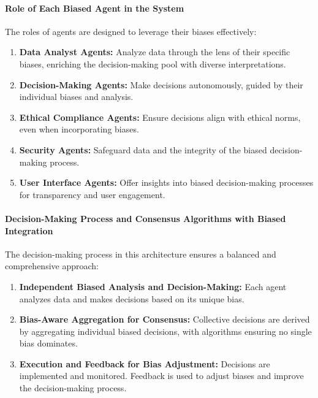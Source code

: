 \hypertarget{role-of-each-biased-agent-in-the-system}{%
\paragraph{Role of Each Biased Agent in the
System}\label{role-of-each-biased-agent-in-the-system}}

The roles of agents are designed to leverage their biases effectively:

\begin{enumerate}
\def\labelenumi{\arabic{enumi}.}
\tightlist
\item
  \textbf{Data Analyst Agents:} Analyze data through the lens of their
  specific biases, enriching the decision-making pool with diverse
  interpretations.
\item
  \textbf{Decision-Making Agents:} Make decisions autonomously, guided
  by their individual biases and analysis.
\item
  \textbf{Ethical Compliance Agents:} Ensure decisions align with
  ethical norms, even when incorporating biases.
\item
  \textbf{Security Agents:} Safeguard data and the integrity of the
  biased decision-making process.
\item
  \textbf{User Interface Agents:} Offer insights into biased
  decision-making processes for transparency and user engagement.
\end{enumerate}

\hypertarget{decision-making-process-and-consensus-algorithms-with-biased-integration}{%
\paragraph{Decision-Making Process and Consensus Algorithms with Biased
Integration}\label{decision-making-process-and-consensus-algorithms-with-biased-integration}}

The decision-making process in this architecture ensures a balanced and
comprehensive approach:

\begin{enumerate}
\def\labelenumi{\arabic{enumi}.}
\tightlist
\item
  \textbf{Independent Biased Analysis and Decision-Making:} Each agent
  analyzes data and makes decisions based on its unique bias.
\item
  \textbf{Bias-Aware Aggregation for Consensus:} Collective decisions
  are derived by aggregating individual biased decisions, with
  algorithms ensuring no single bias dominates.
\item
  \textbf{Execution and Feedback for Bias Adjustment:} Decisions are
  implemented and monitored. Feedback is used to adjust biases and
  improve the decision-making process.
\end{enumerate}

